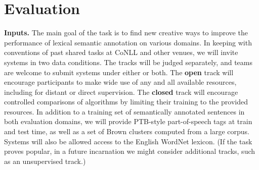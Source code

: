 \documentclass[11pt]{article}
\newcommand{\citeposs}[1]{\citeauthor{#1}'s (\citeyear{#1})}
\newcommand{\ensuretext}[1]{#1}
\newcommand{\nssmarker}{\ensuretext{\textcolor{magenta}{\ensuremath{^{\textsc{NS}}_{\textsc{S}}}}}}
\newcommand{\arkcomment}[3]{\ensuretext{\textcolor{#3}{[#1 #2]}}}
\newcommand{\nss}[1]{\arkcomment{\nssmarker}{#1}{magenta}}
\newcommand{\longversion}[1]{} %
\begin{document}
\section{Evaluation}
\longversion{
\subsection{System Submission Process}

On May~5,~2015, teams will be furnished with the test data (minus the gold labels). 
They will have until May~10 to submit up to 3~system predictions for evaluation. 
The test data will include sentences from both evaluation domains, 
in a random order: to encourage robust systems, 
the domain of each sentence will not be marked at test time, 
and the proportion of sentences from each domain is not guaranteed to be 
the same in the trial, train, dev, and test sets.\nss{is this crazy?}

\subsection{Splits}

We adopt \citeposs{schneider-14} splits of the \textsc{Reviews} data: 
101~documents (500~sentences, 7,171~words) are held out as a test set, 
leaving 3,312~sentences\slash 48,408~words for training\slash development.

For \textsc{Tweets}, 
we follow \citeposs{johannsen-14} splits: 
\nss{sizes of splits}.
The data from Ritter is used as follows: 551 tweets (10,652 tokens) serve as training data, 118 (2242 tokens) as dev and another 118 (2291 tokens) as test set. Additionally, there is a second test set, drawn from a different sample of 200 tweets (3064 tokens).
}

\textbf{Inputs.}
The main goal of the task is to find new creative ways to improve the performance of lexical semantic annotation on various domains. 
In keeping with conventions of past shared tasks at CoNLL and other venues, 
we will invite systems in two data conditions.
The tracks will be judged separately, and teams are welcome to submit systems under either or both.
The \textbf{open} track will encourage participants to make 
wide use of any and all available resources, including for 
distant or direct supervision. 
The \textbf{closed} track will encourage controlled comparisons of algorithms 
by limiting their training to the provided resources. 
In addition to a training set of semantically annotated sentences in both evaluation domains, 
we will provide PTB-style part-of-speech tags at train and test time, 
as well as a set of Brown clusters \citep{brown-92} computed from a large corpus.
Systems will also be allowed access to the English WordNet lexicon.
(If the task proves popular, in a future incarnation we might consider additional tracks, 
such as an unsupervised track.)
\end{document}
